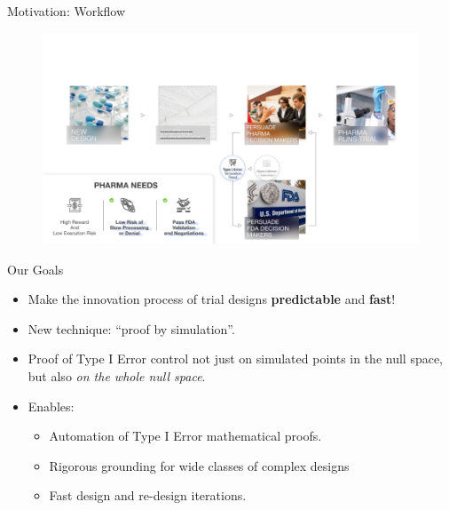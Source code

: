 \begin{frame}{Motivation: Workflow}
\begin{figure}
\centering
\includegraphics[width=\textwidth]{figures/motivation-4.png}
\end{figure}
\end{frame}
\fi

\begin{frame}{Our Goals}
\begin{itemize}
    \item Make the innovation process of trial designs \textbf{predictable} and \textbf{fast}!
    \item New technique: ``proof by simulation''.
    \item Proof of Type I Error control not just on simulated points in the null space, but also \emph{on the whole null space}.
    \item Enables:
    \begin{itemize}
        \item Automation of Type I Error mathematical proofs.
        \item Rigorous grounding for wide classes of complex designs
        \item Fast design and re-design iterations.
    \end{itemize}
\end{itemize}
\end{frame}

